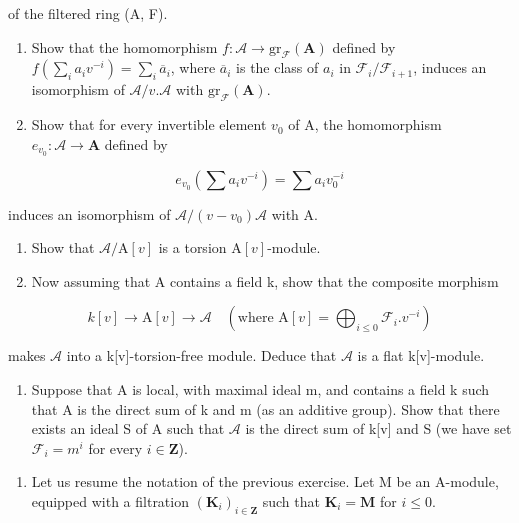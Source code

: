 of the filtered ring (A, F).

\begin{enumerate}
\def\labelenumi{\alph{enumi})}
\item
  Show that the homomorphism \(f: \mathcal{A} \to \mathrm{gr}_{\mathcal{F}}(\mathbf{A})\) defined by \(f\left(\sum_{i} a_i v^{-i}\right) = \sum_{i} \overline{a}_i\), where \(\overline{a}_i\) is the class of \(a_i\) in \(\mathcal{F}_i / \mathcal{F}_{i+1}\), induces an isomorphism of \(\mathcal{A}/v. \mathcal{A}\) with \(\mathrm{gr}_{\mathcal{F}}(\mathbf{A})\).
\item
  Show that for every invertible element \(v_{0}\) of A, the homomorphism \(e_{v_{0}}: \mathcal{A} \to \mathbf{A}\) defined by
\end{enumerate}

\[
e _ {v _ {0}} (\sum a _ {i} v ^ {- i}) = \sum a _ {i} v _ {0} ^ {- i}
\]

induces an isomorphism of \(\mathcal{A}/(v - v_{0})\mathcal{A}\) with A.

\begin{enumerate}
\def\labelenumi{\alph{enumi})}
\setcounter{enumi}{2}
\item
  Show that \(\mathcal{A}/\mathrm{A}[v]\) is a torsion \(\mathrm{A}[v]\)-module.
\item
  Now assuming that A contains a field k, show that the composite morphism
\end{enumerate}

\[
k [ v ] \rightarrow \mathrm{A} [ v ] \rightarrow \mathcal {A} \quad (\text {where } \mathrm{A} [ v ] = \bigoplus_ {i \leqslant 0} \mathcal {F} _ {i}. v ^ {- i})
\]

makes \(\mathcal{A}\) into a k{[}v{]}-torsion-free module. Deduce that \(\mathcal{A}\) is a flat k{[}v{]}-module.

\begin{enumerate}
\def\labelenumi{\alph{enumi})}
\setcounter{enumi}{4}
\tightlist
\item
  Suppose that A is local, with maximal ideal m, and contains a field k such that A is the direct sum of k and m (as an additive group). Show that there exists an ideal S of A such that \(\mathcal{A}\) is the direct sum of k{[}v{]} and S (we have set \(\mathcal{F}_{i} = m^{i}\) for every \(i \in \mathbf{Z}\)).
\end{enumerate}

\begin{enumerate}
\def\labelenumi{\arabic{enumi})}
\setcounter{enumi}{2}
\tightlist
\item
  Let us resume the notation of the previous exercise. Let M be an A-module, equipped with a filtration \((\mathbf{K}_i)_{i\in\mathbf{Z}}\) such that \(\mathbf{K}_i = \mathbf{M}\) for \(i \leqslant 0\).
\end{enumerate}

